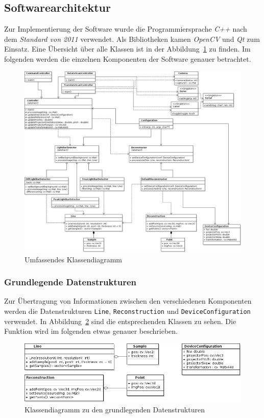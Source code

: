 \documentclass[ngerman,a4paper,parskip=half]{scrartcl}
\begin{document}
\subsection{Softwarearchitektur}

Zur Implementierung der Software wurde die Programmiersprache \emph{C++} nach dem \emph{Standard von 2011} verwendet. Als Bibliotheken kamen \emph{OpenCV} und \emph{Qt} zum Einsatz. Eine Übersicht über alle Klassen ist in der Abbildung~\ref{fig:classes_all} zu finden. Im folgenden werden die einzelnen Komponenten der Software genauer betrachtet.

\begin{figure}[p]
	\centering
	\includegraphics[width=\linewidth]{includes/classdiagram}
	\caption{Umfassendes Klassendiagramm}
	\label{fig:classes_all}
\end{figure}

\subsubsection{Grundlegende Datenstrukturen}
\label{sec:datastructures}

Zur Übertragung von Informationen zwischen den verschiedenen Komponenten werden die Datenstrukturen \texttt{Line}, \texttt{Reconstruction} und \texttt{DeviceConfiguration} verwendet. In Abbildung~\ref{fig:classes_base} sind die entsprechenden Klassen zu sehen. Die Funktion wird im folgenden etwas genauer beschrieben.

\begin{figure}
	\centering
	\includegraphics[width=\linewidth]{includes/classdiagram_base.png}
	\caption{Klassendiagramm zu den grundlegenden Datenstrukturen}
	\label{fig:classes_base}
\end{figure}
\end{document}
